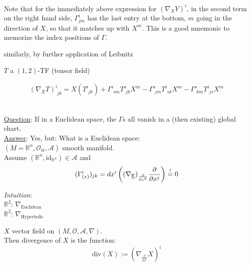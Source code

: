 	

	






	Note that for the immediately above expression for $(\nabla_X Y)^i$, in the second term on the right hand side, $\Gamma_{jm}^i$ has the last entry at the bottom, $m$ going in the direction of $X$, so that it matches up with $X^m$. This is a good mnemonic to memorize the index positions of $\Gamma$. 
	







	similarly, by further application of Leibnitz
	
	$T$ a $(1,2)$-TF (tensor field)
	
	\[
	\begin{aligned}
	(\nabla_X T)^i_{ \, \, jk } = X(T^i_{ \, \, jk} ) + \Gamma^i_{ \, \, s m } T^s_{ \, \, jk} X^m - \Gamma^s_{ \, \, jm} T^i_{ \, \, sk} X^m - \Gamma^s_{ \, \, km} T^i_{ \,\, js} X^m
	\end{aligned}
	\]

\quad \\

\underline{Question}: If in a Euclidean space, the $\Gamma$s all vanish in a (then existing) global chart. \\	

\underline{Answer}: Yes, but:	What is a Euclidean space: \\
	$(M = \mathbb{R}^n, \mathcal{O}_{\text{st}}, \mathcal{A})$ smooth manifold. \\
	Assume $(\mathbb{R}^n, \text{id}_{\mathbb{R}^n} ) \in \mathcal{A}$ and 
	\[
	(\Gamma^i_{(x)})_{jk} = dx^i \left( (\nabla_{\text{\underline{E}}})_{ \frac{ \partial }{ \partial x^k} } \frac{ \partial }{ \partial x^j} \right) \overset{!}{=} 0 
	\]

\emph{Intuition}: \\

$\mathbb{R}^2$: $\nabla_{\text{Euclidean}}$ \\

$\mathbb{R}^2$: $\nabla_{\text{Hyperbolic}}$ 
 
\begin{definition}
	$X$ vector field on $(M, \mathcal{O}, \mathcal{A}, \nabla)$. \\
	Then divergence of $X$ is the function: 
	\[
	\text{div}(X):= \left( \nabla_{\frac{\partial}{\partial x^i}} X \right)^i
	\]
\end{definition}	

